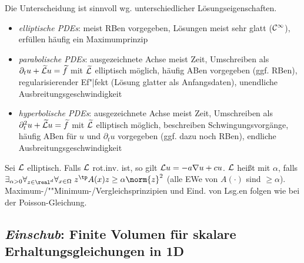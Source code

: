 \begin{Bem}
    Die Unterscheidung ist sinnvoll wg. unterschiedlicher Lösungseigenschaften.
    \begin{itemize}
        \item
        \emph{elliptische PDEs}:
        meist RBen vorgegeben,
        Lösungen meist sehr glatt ($\mathcal{C}^\infty$),
        erfüllen häufig ein Maximumprinzip
        
        \item
        \emph{parabolische PDEs}:
        ausgezeichnete Achse meist Zeit,
        Umschreiben als $\partial_t u + \widetilde{\mathcal{L}} u = \widetilde{f}$ mit
        $\widetilde{\mathcal{L}}$ elliptisch möglich,
        häufig ABen vorgegeben (ggf. RBen),
        regularisierender Ef"|fekt (Lösung glatter als Anfangsdaten),
        unendliche Ausbreitungsgeschwindigkeit
        
        \item
        \emph{hyperbolische PDEs}:
        ausgezeichnete Achse meist Zeit,
        Umschreiben als $\partial_t^2 u + \widetilde{\mathcal{L}} u = \widetilde{f}$ mit
        $\widetilde{\mathcal{L}}$ elliptisch möglich,
        beschreiben Schwingungsvorgänge,
        häufig ABen für $u$ und $\partial_t u$ vorgegeben (ggf. dazu noch RBen),
        endliche Ausbreitungsgeschwindigkeit
    \end{itemize}
\end{Bem}

\begin{Bem}
    Sei $\mathcal{L}$ elliptisch.
    Falls $\mathcal{L}$ rot.inv. ist, so gilt $\mathcal{L} u = -a \nabla u + cu$.
    $\mathcal{L}$ heißt  mit  $\alpha$, falls
    $\exists_{\alpha > 0} \forall_{z \in \real^d} \forall_{x \in \Omega}\;
    z^\tp A(x) z \ge \alpha \norm{z}^2$
    (alle EWe von $A(\cdot)$ sind $\ge \alpha$).
    Maximum-/""Minimum-/Vergleichsprinzipien und Eind. von Lsg.en folgen wie bei
    der Poisson-Gleichung.
\end{Bem}

\pagebreak

\subsection{%
    \emph{Einschub}:
    Finite Volumen für skalare Erhaltungsgleichungen in 1D%
}

